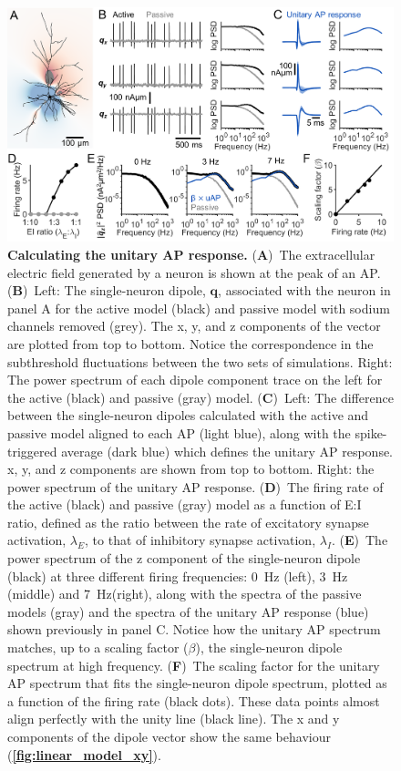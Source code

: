 \begin{figure}[t!]
	\centering
	\includegraphics[width=13.2cm]{Figures/chapter3/figure1.png}
    
    \caption{\textbf{Calculating the unitary AP response.} (\textbf{A})~The extracellular electric field generated by a neuron is shown at the peak of an AP. (\textbf{B})~Left: The single-neuron dipole, $\bm{q}$, associated with the neuron in panel A for the active model (black) and passive model with sodium channels removed (grey). The x, y, and z components of the vector are plotted from top to bottom. Notice the correspondence in the subthreshold fluctuations between the two sets of simulations. Right: The power spectrum of each dipole component trace on the left for the active (black) and passive (gray) model. (\textbf{C})~Left: The difference between the single-neuron dipoles calculated with the active and passive model aligned to each AP (light blue), along with the spike-triggered average (dark blue) which defines the unitary AP response. x, y, and z components are shown from top to bottom. Right: the power spectrum of the unitary AP response. (\textbf{D})~The firing rate of the active (black) and passive (gray) model as a function of E:I ratio, defined as the ratio between the rate of excitatory synapse activation, $\lambda_E$, to that of inhibitory synapse activation, $\lambda_I$. (\textbf{E})~The power spectrum of the z component of the single-neuron dipole (black) at three different firing frequencies: 0~\unit{\hertz} (left), 3~\unit{\hertz} (middle) and 7~\unit{\hertz}(right), along with the spectra of the passive models (gray) and the spectra of the unitary AP response (blue) shown previously in panel C. Notice how the unitary AP spectrum matches, up to a scaling factor ($\beta$), the single-neuron dipole spectrum at high frequency. (\textbf{F})~The scaling factor for the unitary AP spectrum that fits the single-neuron dipole spectrum, plotted as a function of the firing rate (black dots). These data points almost align perfectly with the unity line (black line). The x and y components of the dipole vector show the same behaviour (\textbf{\autoref{fig:linear_model_xy}}).} 
    \label{fig:example_uAP}
\end{figure}

